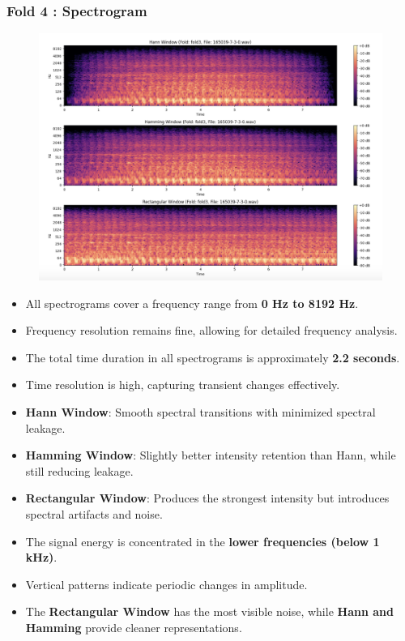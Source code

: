 \documentclass[a4paper,12pt]{article}
\begin{document}
    \subsubsection{Fold 4 : Spectrogram}
    \begin{figure}[H]
        \centering
        \includegraphics[width=1\linewidth]{Fold4.png}
    \end{figure}
    \begin{itemize}
        \item All spectrograms cover a frequency range from  \textbf{0 Hz to 8192 Hz}.
        \item Frequency resolution remains fine, allowing for detailed frequency analysis.
        \item The total time duration in all spectrograms is approximately \textbf{2.2 seconds}.
        \item Time resolution is high, capturing transient changes effectively.
        \item \textbf{Hann Window}: Smooth spectral transitions with minimized spectral leakage.
        \item \textbf{Hamming Window}: Slightly better intensity retention than Hann, while still reducing leakage.
        \item \textbf{Rectangular Window}: Produces the strongest intensity but introduces spectral artifacts and noise.
        \item The signal energy is concentrated in the \textbf{lower frequencies (below 1 kHz)}.
        \item Vertical patterns indicate periodic changes in amplitude.
        \item The \textbf{Rectangular Window} has the most visible noise, while \textbf{Hann and Hamming} provide cleaner representations.
    \end{itemize}
\newpage
\end{document}

